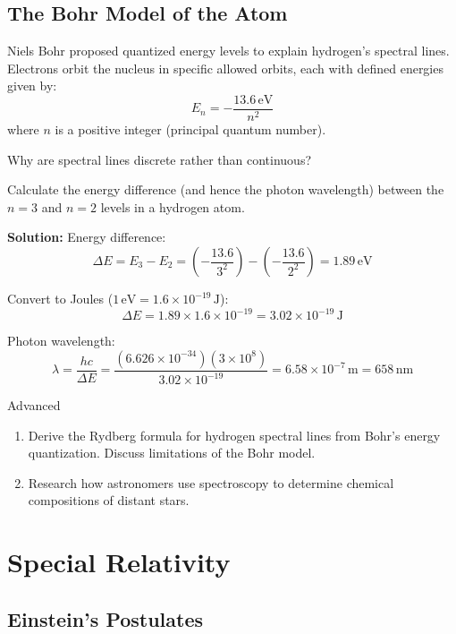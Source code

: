 \subsection{The Bohr Model of the Atom}
\FloatBarrier

Niels Bohr proposed quantized energy levels to explain hydrogen's spectral lines. Electrons orbit the nucleus in specific allowed orbits, each with defined energies given by:
\[
E_n = -\frac{13.6\,\text{eV}}{n^2}
\]
where $n$ is a positive integer (principal quantum number).

\begin{stopandthink}
Why are spectral lines discrete rather than continuous?
\end{stopandthink}

\begin{example}
Calculate the energy difference (and hence the photon wavelength) between the $n=3$ and $n=2$ levels in a hydrogen atom.

\textbf{Solution:} Energy difference:
\[
\Delta E = E_3 - E_2 = \left(-\frac{13.6}{3^2}\right)-\left(-\frac{13.6}{2^2}\right) = 1.89\,\text{eV}
\]

Convert to Joules ($1\,\text{eV}=1.6\times10^{-19}\,\text{J}$):
\[
\Delta E = 1.89\times1.6\times10^{-19}=3.02\times10^{-19}\,\text{J}
\]

Photon wavelength:
\[
\lambda=\frac{hc}{\Delta E}=\frac{(6.626\times10^{-34})(3\times10^8)}{3.02\times10^{-19}}=6.58\times10^{-7}\,\text{m}=658\,\text{nm}
\]
\end{example}

\begin{tieredquestions}{Advanced}
\begin{enumerate}
\item Derive the Rydberg formula for hydrogen spectral lines from Bohr's energy quantization. Discuss limitations of the Bohr model.
\item Research how astronomers use spectroscopy to determine chemical compositions of distant stars.
\end{enumerate}
\end{tieredquestions}

\FloatBarrier

\section{Special Relativity}
\FloatBarrier

\subsection{Einstein's Postulates}
\FloatBarrier

